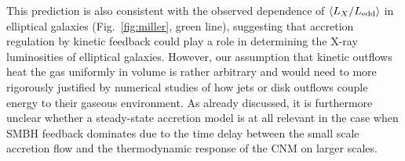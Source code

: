 \documentclass[usenatbib,fleqn]{mn2e}
\begin{document}
This prediction is also consistent with the observed dependence of $\langle
L_{X}/L_{\rm edd} \rangle$ in elliptical galaxies
(Fig.~\ref{fig:miller}, green line), suggesting that accretion regulation
by kinetic feedback could play a role in determining the X-ray
luminosities of elliptical galaxies.  However, our assumption that
kinetic outflows heat the gas uniformly in volume is rather arbitrary and would need to more rigorously justified by numerical studies of how jets or disk outflows couple energy to their gaseous
environment.  As already discussed, it is furthermore unclear whether a steady-state accretion model is at all relevant in the case when SMBH feedback dominates due to the time delay between the small scale accretion flow and the thermodynamic response of the CNM on larger scales.  





\end{document}
